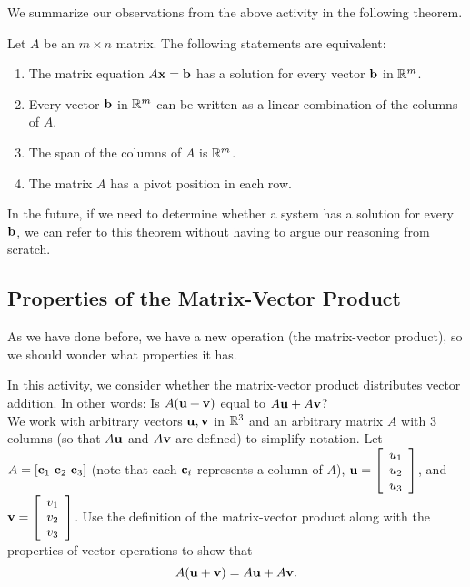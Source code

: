 We summarize our observations from the above activity in the following theorem.

\begin{theorem} Let $A$ be an $m \times n$ matrix. The following statements are equivalent:
    \begin{enumerate}
    \item The matrix equation $A \mathbf{x} = \mathbf{b}$ has a solution for every vector $\mathbf{b}$ in $\mathbb{R}^m$.
    \item Every vector $\mathbf{b}$ in $\mathbb{R}^m$ can be written as a linear combination of the columns of $A$.
    \item The span of the columns of $A$ is $\mathbb{R}^m$.
    \item The matrix $A$ has a pivot position in each row.
    \end{enumerate}
\end{theorem}



In the future, if we need to determine whether a system has a solution for every $\mathbf{b}$, we can refer to this theorem without having to argue our reasoning from scratch.



\subsection*{Properties of the Matrix-Vector Product}

As we have done before, we have a new operation (the matrix-vector product), so we should wonder what properties it has. 


\begin{activity} \label{act:A1.4_8} In this activity, we consider whether the matrix-vector product distributes vector addition. In other words: Is $A(\mathbf{u} + \mathbf{v})$ equal to $A\mathbf{u} + A\mathbf{v}$?\\

We work with arbitrary vectors $\mathbf{u}, \mathbf{v}$ in $\mathbb{R}^3$ and an arbitrary matrix $A$ with 3 columns (so that $A\mathbf{u}$ and $A\mathbf{v}$ are defined) to simplify notation. Let $A = [\vc_1 \ \vc_2 \ \vc_3]$ (note that each $\mathbf{c}_i$ represents a column of $A$), $\mathbf{u} = \left[ \begin{array}{c} u_1 \\ u_2 \\ u_3 \end{array} \right]$, and $\mathbf{v} = \left[ \begin{array}{c} v_1 \\ v_2 \\ v_3 \end{array} \right]$. Use the definition of the matrix-vector product along with the properties of vector operations to show that
\[A(\mathbf{u} + \mathbf{v})= A\mathbf{u} + A\mathbf{v}.\]


\end{activity}



